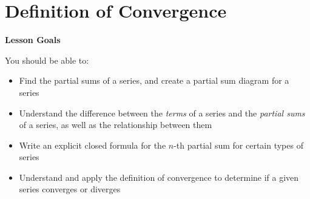 \documentclass[main]{subfiles}
\begin{document}
\ifSubfilesClassLoaded{%
  \chaptermark{\chaptertwo}
}{}

\section{Definition of Convergence} \label{ws2-4}

\begin{framed}
\centerline{\textbf{Lesson Goals}}

You should be able to:
\begin{itemize}
\item Find the partial sums of a series, and create a partial sum diagram for a series
\item Understand the difference between the \textit{terms} of a series and the \textit{partial sums} of a series, as well as the relationship between them
\item Write an explicit closed formula for the $n$-th partial sum for certain types of series
\item Understand and apply the definition of convergence to determine if a given series converges or diverges
\end{itemize}
\end{framed}
\end{document}
